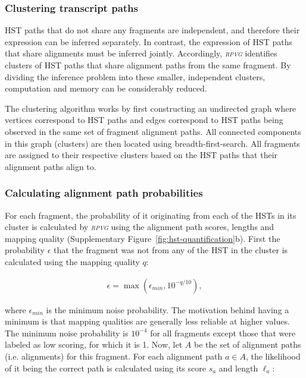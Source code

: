 \documentclass[11pt]{ucthesis}
\newcommand{\tool}[1]{\emph{\textsc{#1}}}
\begin{document}
\subsubsection{Clustering transcript paths}

HST paths that do not share any fragments are independent, and therefore their expression can be inferred separately. In contrast, the expression of HST paths that share alignments must be inferred jointly. Accordingly, \tool{rpvg} identifies clusters of HST paths that share alignment paths from the same fragment. By dividing the inference problem into these smaller, independent clusters, computation and memory can be considerably reduced. 

The clustering algorithm works by first constructing an undirected graph where vertices correspond to HST paths and edges correspond to HST paths being observed in the same set of fragment alignment paths. All connected components in this graph (clusters) are then located using breadth-first-search. All fragments are assigned to their respective clusters based on the HST paths that their alignment paths align to. 

\subsubsection{Calculating alignment path probabilities}

For each fragment, the probability of it originating from each of the HSTs in its cluster is calculated by \tool{rpvg} using the alignment path scores, lengths and mapping quality (Supplementary Figure~\ref{fig:hst-quantification}b). First the probability $\epsilon$ that the fragment was not from any of the HST in the cluster is calculated using the mapping quality $q$:

\begin{align}
    \epsilon=\max\left(\epsilon_{min}, 10^{-q/10}\right),
\end{align}

\noindent where $\epsilon_{min}$ is the minimum noise probability. The motivation behind having a minimum is that mapping qualities are generally less reliable at higher values. The minimum noise probability is $10^{-4}$ for all fragments except those that were labeled as low scoring, for which it is 1. 
Now, let $A$ be the set of alignment paths (i.e. alignments) for this fragment. For each alignment path ${a\in A}$, the likelihood of it being the correct path is calculated using its score $s_a$ and length $\ell_a$:
\end{document}
